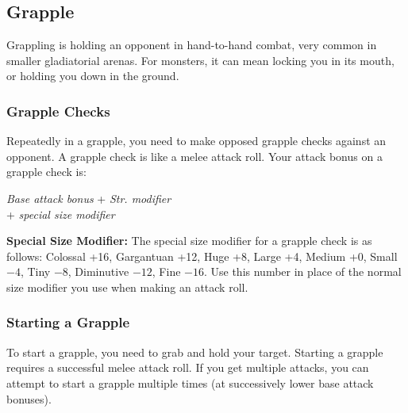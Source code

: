 \subsection{Grapple}
Grappling is holding an opponent in hand-to-hand combat, very common in smaller gladiatorial arenas. For monsters, it can mean locking you in its mouth, or holding you down in the ground.

\subsubsection{Grapple Checks}
Repeatedly in a grapple, you need to make opposed grapple checks against an opponent. A grapple check is like a melee attack roll. Your attack bonus on a grapple check is:

\begin{Formula}{
	\textit{Base attack bonus} + \textit{Str. modifier}\\
	+ \textit{special size modifier}
}
\end{Formula}

\textbf{Special Size Modifier:} The special size modifier for a grapple check is as follows: Colossal +16, Gargantuan +12, Huge +8, Large +4, Medium +0, Small $-4$, Tiny $-8$, Diminutive $-12$, Fine $-16$. Use this number in place of the normal size modifier you use when making an attack roll.

\subsubsection{Starting a Grapple}
To start a grapple, you need to grab and hold your target. Starting a grapple requires a successful melee attack roll. If you get multiple attacks, you can attempt to start a grapple multiple times (at successively lower base attack bonuses).

